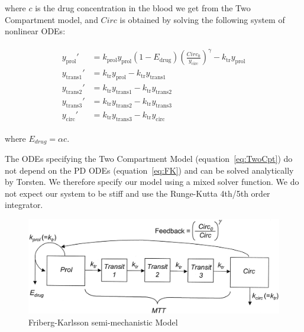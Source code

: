 \documentclass[11pt]{amsart}
\begin{document}
where $c$ is the drug concentration in the blood we get from the Two Compartment model, and $Circ$ is obtained by solving the following system of nonlinear ODEs:

\begin{eqnarray}
  \begin{aligned}
   y_\mathrm{prol}' &= k_\mathrm{prol} y_\mathrm{prol} (1 - E_\mathrm{drug})\left(\frac{Circ_0}{y_\mathrm{circ}}\right)^\gamma - k_\mathrm{tr}y_\mathrm{prol} \\
   y_\mathrm{trans1}' &= k_\mathrm{tr} y_\mathrm{prol} - k_\mathrm{tr} y_\mathrm{trans1} \\
   y_\mathrm{trans2}' &= k_\mathrm{tr} y_\mathrm{trans1} - k_\mathrm{tr} y_\mathrm{trans2}  \\
   y_\mathrm{trans3}' &= k_\mathrm{tr} y_\mathrm{trans2} - k_\mathrm{tr} y_\mathrm{trans3}  \\
   y_\mathrm{circ}' &= k_\mathrm{tr} y_\mathrm{trans3} - k_\mathrm{tr} y_\mathrm{circ}
   \end{aligned}
   \label{eq:FK}
\end{eqnarray}

where $E_{drug}  = \alpha c$.

The ODEs specifying the Two Compartment Model (equation~\ref{eq:TwoCpt}) do not depend on the PD ODEs (equation~\ref{eq:FK}) and can be solved analytically by Torsten. We therefore specify our model using a mixed solver function. We do not expect our system to be stiff and use the Runge-Kutta 4th/5th order integrator.


\begin{figure}[htbp]
\includegraphics[width=4.5in,trim=0in 0in 0 0in]{graphics/neutrophilModel.jpg}
\caption{Friberg-Karlsson semi-mechanistic Model \cite{2364}}
\label{FK}
\end{figure}
\end{document}

